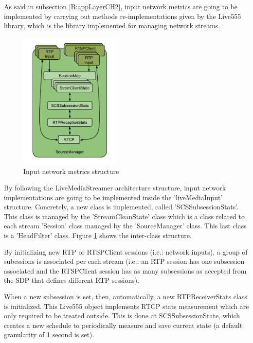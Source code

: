 As said in subsection \ref{B:appLayerCH2}, input network metrics are going to be implemented by carrying out methods re-implementations given by the Live555 library, which is the library implemented for managing network streams.  

\begin{figure}[!htb]
\begin{center}
\includegraphics[width=0.45\textwidth]{./images/SourceManager.png}
\caption{Input network metrics structure}
\label{F:inms}
\end{center}
\end{figure}

By following the LiveMediaStreamer architecture structure, input network implementations are going to be implemented inside the 'liveMediaInput' structure. Concretely, a new class is implemented, called 'SCSSubsessionStats'. This class is managed by the 'StreamCleanState' class which is a class related to each stream 'Session' class managed by the 'SourceManager' class. This last class is a 'HeadFilter' class. Figure \ref{F:inms} shows the inter-class structure.

By initializing new RTP or RTSPClient sessions (i.e.: network inputs), a group of subessions is associated per each stream (i.e.: an RTP session has one subsession associated and the RTSPClient session has as many subsessions as accepted from the SDP that defines different RTP sessions).

When a new subsession is set, then, automatically, a new RTPReceiverStats class is initialized. This Live555 object implements RTCP stats measurement which are only required to be treated outside. This is done at SCSSubsessionState, which creates a new schedule to periodically measure and save current state (a default granularity of 1 second is set).

